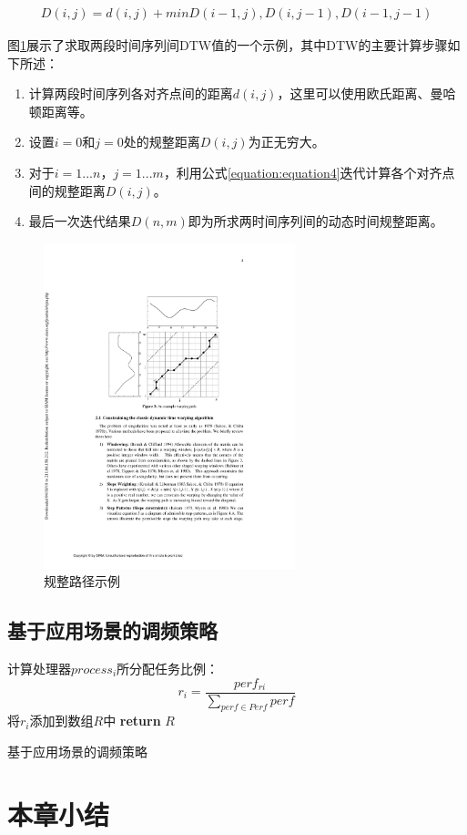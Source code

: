 \begin{equation}
    \label{equation:equation4}
    \begin{aligned}
        D(i,j) = d(i,j) + min{D(i-1,j),D(i,j-1),D(i-1,j-1)}
    \end{aligned}
\end{equation}

图\ref{figure:figure40}展示了求取两段时间序列间DTW值的一个示例，其中DTW的主要计算步骤如下所述：
\begin{enumerate}
  \item 计算两段时间序列各对齐点间的距离$d(i,j)$，这里可以使用欧氏距离、曼哈顿距离等。
  \item 设置$i = 0$和$j = 0$处的规整距离$D(i,j)$为正无穷大。
  \item 对于$i = 1 ... n$，$j = 1 ... m$，利用公式\ref{equation:equation4}迭代计算各个对齐点间的规整距离$D(i,j)$。
  \item 最后一次迭代结果$D(n,m)$即为所求两时间序列间的动态时间规整距离。
\end{enumerate}

\begin{figure}[htbp]
    \centering
    \includegraphics[height=0.56\textwidth, width=0.65\textwidth]{figures/dtw_dist.pdf}
    \caption{规整路径示例 \cite{keogh2001derivative}}\label{figure:figure40}
\end{figure}

\subsection{基于应用场景的调频策略}

\begin{algorithm}[htbp]
  \small
  \SetAlgoLined
    \begin{spacing}{0.9}
     {
        计算处理器$process_i$所分配任务比例：
        $$r_i=\frac{perf_{ri}}{\sum_{perf \in Perf}perf}$$
        将$r_i$添加到数组$R$中\;
    }
    \textbf{return} $R$\;
   \end{spacing}
  \caption{基于应用场景的调频策略}
  \label{algo:algorithm10}
\end{algorithm}

\section{本章小结}


\cleardoublepage 